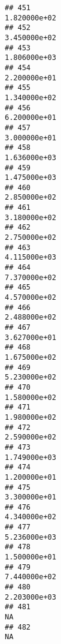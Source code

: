 \documentclass[
]{article}
\begin{document}
\begin{verbatim}
## 451                                                               1.820000e+02
## 452                                                               3.450000e+02
## 453                                                               1.806000e+03
## 454                                                               2.200000e+01
## 455                                                               1.340000e+02
## 456                                                               6.200000e+01
## 457                                                               3.000000e+01
## 458                                                               1.636000e+03
## 459                                                               1.475000e+03
## 460                                                               2.850000e+02
## 461                                                               3.180000e+02
## 462                                                               2.750000e+02
## 463                                                               4.115000e+03
## 464                                                               7.370000e+02
## 465                                                               4.570000e+02
## 466                                                               2.488000e+02
## 467                                                               3.627000e+01
## 468                                                               1.675000e+02
## 469                                                               5.230000e+02
## 470                                                               1.580000e+02
## 471                                                               1.980000e+02
## 472                                                               2.590000e+02
## 473                                                               1.749000e+03
## 474                                                               1.200000e+01
## 475                                                               3.300000e+01
## 476                                                               4.340000e+02
## 477                                                               5.236000e+03
## 478                                                               1.500000e+01
## 479                                                               7.440000e+02
## 480                                                               2.203000e+03
## 481                                                                         NA
## 482                                                                         NA

\end{verbatim}
\end{document}
